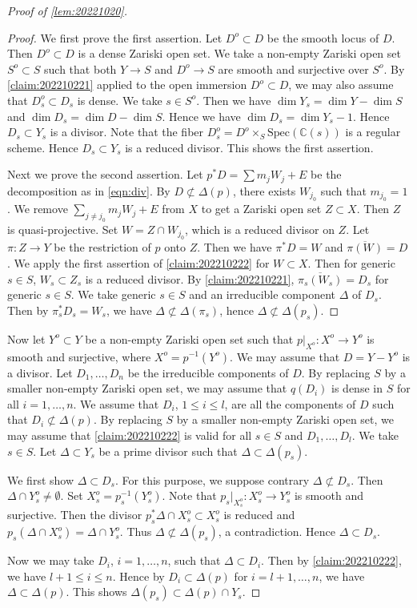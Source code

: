 \documentclass[10pt,a4paper]{amsart}
\begin{document}
\begin{proof}[Proof of \cref{lem:20221020}]
\begin{proof}
We first prove the first assertion.
Let $D^o\subset D$ be the smooth locus of $D$.
Then $D^o\subset D$ is a dense Zariski open set.
We take a non-empty Zariski open set $S^o\subset S$ such that both $Y\to S$ and $D^o\to S$ are smooth and surjective over $S^o$.
By \cref{claim:202210221} applied to the open immersion $D^o\subset D$, we may also assume that $D^o_s\subset D_s$ is dense.
We take $s\in S^o$.
Then we have $\dim Y_s=\dim Y-\dim S$ and $\dim D_s=\dim D-\dim S$.
Hence we have $\dim D_s=\dim Y_s-1$.
Hence $D_s\subset Y_s$ is a divisor.
Note that the fiber $D^o_s=D^o\times_S\mathrm{Spec}(\mathbb C(s))$ is a regular scheme.
Hence $D_s\subset Y_s$ is a reduced divisor.
This shows the first assertion.

Next we prove the second assertion.
Let $p^*D=\sum m_jW_j+E$ be the decomposition as in \eqref{eqn:div}.
By $D\not\subset \Delta(p)$, there exists $W_{j_0}$ such that $m_{j_0}=1$.
We remove $\sum_{j\not=j_0} m_jW_j+E$ from $X$ to get a Zariski open set $Z\subset X$.
Then $Z$ is quasi-projective.
Set $W=Z\cap W_{j_0}$, which is a reduced divisor on $Z$.
Let $\pi:Z\to Y$ be the restriction of $p$ onto $Z$.
Then we have $\pi^*D=W$ and $\overline{\pi(W)}=D$.
We apply the first assertion of \cref{claim:202210222} for $W\subset X$.
Then for generic $s\in S$, $W_s\subset Z_s$ is a reduced divisor.
By \cref{claim:202210221}, $\overline{\pi_s(W_s)}=D_s$ for generic $s\in S$.
We take generic $s\in S$ and an irreducible component $\Delta$ of $D_s$.
Then by $\pi_s^*D_s=W_s$, we have $\Delta\not\subset \Delta(\pi_s)$, hence $\Delta\not\subset \Delta(p_s)$.
\end{proof}


Now let $Y^o\subset Y$ be a non-empty Zariski open set such that $p|_{X^o}:X^o\to Y^o$ is smooth and surjective, where $X^o=p^{-1}(Y^o)$.
We may assume that $D=Y-Y^o$ is a divisor.
Let $D_1,\ldots,D_n$ be the irreducible components of $D$.
By replacing $S$ by a smaller non-empty Zariski open set, we may assume that $q(D_i)$ is dense in $S$ for all $i=1,\ldots,n$.
We assume that $D_i$, $1\leq i\leq l$, are all the components of $D$ such that $D_i\not\subset \Delta(p)$.
By replacing $S$ by a smaller non-empty Zariski open set, we may assume that \cref{claim:202210222} is valid for all $s\in S$ and $D_{1},\ldots,D_l$.
We take $s\in S$.
Let $\Delta\subset Y_s$ be a prime divisor such that $\Delta\subset \Delta(p_s)$.

We first show $\Delta\subset D_s$.
For this purpose, we suppose contrary $\Delta\not\subset D_s$.
Then $\Delta\cap Y^o_s\not=\emptyset$.
Set $X^o_s=p_s^{-1}(Y^o_s)$.
Note that $p_s|_{X^o_s}:X^o_s\to Y^o_s$ is smooth and surjective.
Then the divisor $p_s^*\Delta\cap X^o_s\subset X^o_s$ is reduced and $p_s(\Delta\cap X^o_s)=\Delta\cap Y^o_s$.
Thus $\Delta\not\subset \Delta(p_s)$, a contradiction.
Hence $\Delta\subset D_s$.

Now we may take $D_i$, $i=1,\ldots,n$, such that $\Delta\subset D_i$.
Then by \cref{claim:202210222}, we have $l+1\leq i\leq n$.
Hence by $D_i\subset \Delta(p)$ for $i=l+1,\ldots,n$, we have $\Delta\subset \Delta(p)$.
This shows $\Delta(p_s)\subset \Delta(p)\cap Y_s$.
\end{proof}
\end{document}
